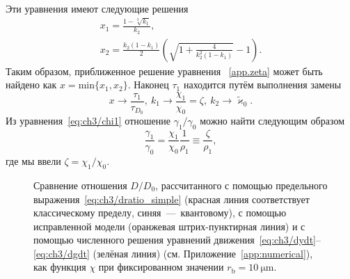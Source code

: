 Эти уравнения имеют следующие решения
\begin{gather}
    x_1 = \frac{1-\sqrt[3]{k_1}}{k_2}, \\
    x_2 = \frac{k_2(1-k_1)}{2} \left( \sqrt{1 + \frac{4}{k_2^2 (1-k_1)}} - 1 \right).
\end{gather}
Таким образом, приближенное решение уравнения ~\eqref{app.zeta} может быть найдено как $x = \text{min}\{x_1, x_2\}$.
Наконец $\tau_1$ находится путём выполнения замены
\begin{equation}
    x \rightarrow \frac{\tau_1}{\tau_{D_0}} ,\ 
    k_1 \rightarrow \frac{\chi_1}{\chi_0} = \zeta ,\ 
    k_2 \rightarrow \tilde{\varkappa}_0.
\end{equation}
Из уравнения~\eqref{eq:ch3/chi1} отношение $\gamma_1/\gamma_0$ можно найти следующим образом
\begin{equation}
    \frac{\gamma_1}{\gamma_0} = \frac{\chi_1}{\chi_0} \frac{1}{\rho_1} \equiv \frac{\zeta}{\rho_1},
\end{equation}
где мы ввели $\zeta=\chi_1/\chi_0$.

\begin{figure}
    \caption[Сравнение точности вычисления отношения $D/D_0$ в помощью различных методов]{\label{fig:ch3/scalings} 
    Сравнение отношения $D/D_0$, рассчитанного с помощью предельного выражения~\eqref{eq:ch3/dratio_simple} (красная линия соответствует классическому пределу, синяя~---~квантовому), с помощью исправленной модели (оранжевая штрих-пунктирная линия) и с помощью численного решения уравнений движения~\eqref{eq:ch3/dydt}--\eqref{eq:ch3/dgdt} (зелёная линия) (см. Приложение~\ref{app:numerical}), как функция $\chi$ при фиксированном значении $r_\mathrm{b} = \SI{10}{\um}$.}
\end{figure}


